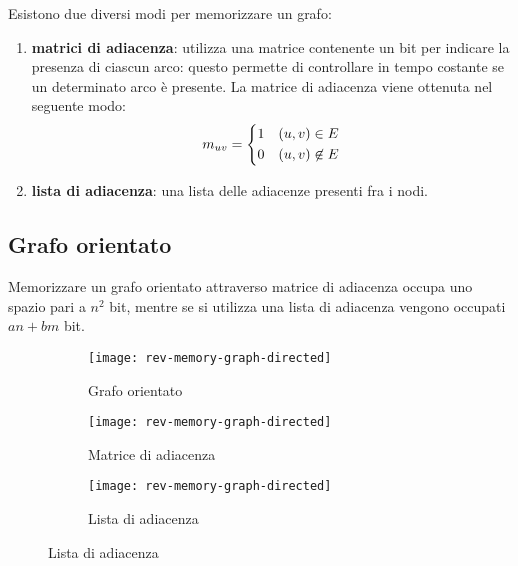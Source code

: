 Esistono due diversi modi per memorizzare un grafo:
\begin{enumerate}
	\item \textbf{matrici di adiacenza}: utilizza una matrice contenente un bit per indicare la presenza di ciascun arco: questo permette di controllare in tempo costante se un determinato arco è presente.
	La matrice di adiacenza viene ottenuta nel seguente modo:
	\[
		m_{uv} =
		\begin{dcases}
			1 & (u,v) \in E \\
			0 & (u,v) \not\in E
		\end{dcases}
	\]
	\item \textbf{lista di adiacenza}: una lista delle adiacenze presenti fra i nodi.
\end{enumerate}

\clearpage
\subsection*{Grafo orientato}
\vspace{-5pt}

Memorizzare un grafo orientato attraverso matrice di adiacenza occupa uno spazio pari a \(n^2\) bit, mentre se si utilizza una lista di adiacenza vengono occupati \(an + bm\) bit.

\begin{figure}[H]\hfill
	\begin{subfigure}[t]{.25\textwidth}\centering
		\texttt{[image: rev-memory-graph-directed]}
		\caption{Grafo orientato}
	\end{subfigure}\hfill
	\begin{subfigure}[t]{.25\textwidth}\centering
		\texttt{[image: rev-memory-graph-directed]}
		\caption{Matrice di adiacenza}
	\end{subfigure}\hfill
	\begin{subfigure}[t]{.35\textwidth}\raggedright
		\texttt{[image: rev-memory-graph-directed]}
		\caption{Lista di adiacenza}
	\end{subfigure}%
\end{figure}

